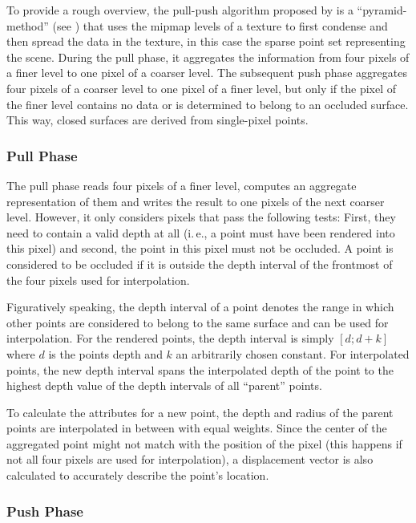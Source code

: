 To provide a rough overview, the pull-push algorithm proposed by \cite{Marroquim:2007:reconstruction} is a ``pyramid-method'' (see \cite{Strengert:2006:Pyramid}) that uses the mipmap levels of a texture to first condense and then spread the data in the texture, in this case the sparse point set representing the scene. During the pull phase, it aggregates the information from four pixels of a finer level to one pixel of a coarser level. The subsequent push phase aggregates four pixels of a coarser level to one pixel of a finer level, but only if the pixel of the finer level contains no data or is determined to belong to an occluded surface. This way, closed surfaces are derived from single-pixel points.

\subsubsection{Pull Phase}
The pull phase reads four pixels of a finer level, computes an aggregate representation of them and writes the result to one pixels of the next coarser level. However, it only considers pixels that pass the following tests: First, they need to contain a valid depth at all (i.\,e., a point must have been rendered into this pixel) and second, the point in this pixel must not be occluded. A point is considered to be occluded if it is outside  the depth interval of the frontmost of the four pixels used for interpolation.

Figuratively speaking, the depth interval of a point denotes the range in which other points are considered to belong to the same surface and can be used for interpolation. For the rendered points, the depth interval is simply $[d;d+k]$ where $d$ is the points depth and $k$ an arbitrarily chosen constant. For interpolated points, the new depth interval spans the interpolated depth of the point to the highest depth value of the depth intervals of all ``parent'' points.

To calculate the attributes for a new point, the depth and radius of the parent points are interpolated in between with equal weights. Since the center of the aggregated point might not match with the position of the pixel (this happens if not all four pixels are used for interpolation), a displacement vector is also calculated to accurately describe the point's location.


\subsubsection{Push Phase}

